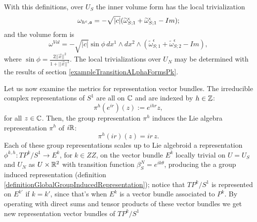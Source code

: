 With this definitions, over $U_S$ the inner volume form has the local trivialization
\begin{equation}
    \omega_{h^c, \alg a} = -\sqrt{|c|} (\tilde \omega^\epsilon_{S; 1} + \tilde \omega^\epsilon_{S; 1} - Im);
\end{equation}
and the volume form is
\begin{equation}
    \omega^{Vol} = - \sqrt{|c|} \sin \phi \, dx^1 \wedge dx^2 \wedge (\tilde \omega^\epsilon_{S; 1} + \tilde \omega^\epsilon_{S; 2} - Im),
\end{equation}
where $\sin \phi = \frac{2 ||\vec x||^2}{1 + ||\vec x||^2}$.
The local trivializations over $U_N$ may be determined with the results of section \ref{exampleTransitionALphaFormsPk}.

Let us now examine the metrics for representation vector bundles. The irreducible complex representations of $S^1$ are all on $\mathbb{C}$ and are indexed by $h \in \mathbb{Z}$:
\begin{equation*}
    \pi^h(e^{ir})(z) := e^{ihr}z,
\end{equation*}
for all $z \in \mathbb{C}$. Then, the group representation $\pi^h$ induces the Lie algebra representation $\pi^h$ of $i\mathbb{R}$:
\begin{equation}
    \pi^h(ir)(z) = ir\,z.
\end{equation}
Each of these group representations scales up to Lie algebroid a representation $\phi^{k, h}: TP^k/S^1 \to E^k$, for $k \in ZZ$, on the vector bundle $E^k$ locally trivial on $U = U_S$ and $U_N$ as $U\times \mathbb{R}^2$ with transition function $\beta^N_S = e^{ik\theta}$, producing the a group induced representation (definition \ref{definitionGlobalGroupInducedRepresentation}); notice that $TP^k/S^1$ is represented on $E^{k'}$ if $k = k'$, since that's when $E^k$ is a vector bundle associated to $P^k$. By operating with direct sums and tensor products of these vector bundles we get new representation vector bundles of $TP^k/S^1$

